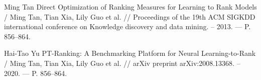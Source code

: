 \begin{thebibliography}{}
 Ming Tan Direct Optimization of Ranking Measures for Learning to Rank Models / Ming Tan, Tian Xia, Lily Guo et al. // Proceedings of the 19th ACM SIGKDD international conference on Knowledge discovery and data mining. – 2013. --- P. 856--864.

 Hai-Tao Yu PT-Ranking: A Benchmarking Platform for Neural Learning-to-Rank / Ming Tan, Tian Xia, Lily Guo et al. // arXiv preprint arXiv:2008.13368. – 2020. --- P. 856--864.

\end{thebibliography}


